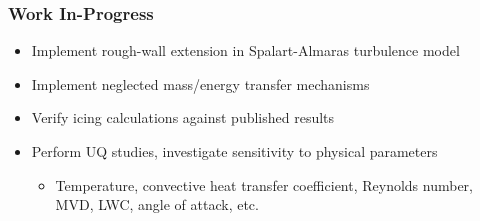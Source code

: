 \documentclass[9pt]{beamer}
\begin{document}
\begin{frame}
\frametitle{Work In-Progress}
\label{sec-3-6}

\begin{itemize}
\item Implement rough-wall extension in Spalart-Almaras turbulence model
\item Implement neglected mass/energy transfer mechanisms
\item Verify icing calculations against published results
\item Perform UQ studies, investigate sensitivity to physical parameters
\begin{itemize}
\item Temperature, convective heat transfer coefficient, Reynolds number, MVD, LWC, angle of attack, etc.
\end{itemize}
\end{itemize}
\end{frame}
\end{document}
